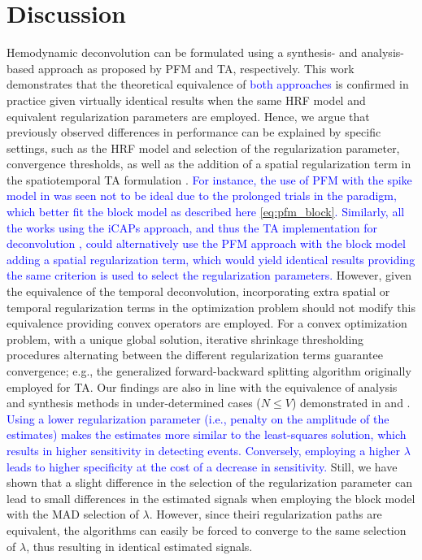 
\section{Discussion}

Hemodynamic deconvolution can be formulated using a synthesis- and
analysis-based approach as proposed by PFM and TA, respectively. This work
demonstrates that the theoretical equivalence of \textcolor{blue}{both
approaches} is confirmed in practice given virtually identical results when the
same HRF model and equivalent regularization parameters are employed. Hence, we
argue that previously observed differences in performance can be explained by
specific settings, such as the HRF model and selection of the regularization
parameter, convergence thresholds, as well as the addition of a spatial
regularization term in the spatiotemporal TA formulation
\citep{Karahanoglu2013TotalactivationfMRI}. \textcolor{blue}{For instance, the
use of PFM with the spike model in \citep{Tan_2017} was seen not to be ideal due
to the prolonged trials in the paradigm, which better fit the block model as
described here \eqref{eq:pfm_block}. Similarly, all the works using the iCAPs
approach, and thus the TA implementation for deconvolution
\citep{Kinany2020DynamicFunctionalConnectivity,Zoeller2019Largescalebrain,
Pirondini2022Poststrokereorganization},
could alternatively use the PFM approach with the block model adding a
spatial regularization term, which would yield identical results providing the
same criterion is used to select the regularization parameters.} However, given
the equivalence of the temporal deconvolution, incorporating extra spatial or
temporal regularization terms in the optimization problem should not modify this
equivalence providing convex operators are employed. For a convex optimization
problem, with a unique global solution, iterative shrinkage thresholding
procedures alternating between the different regularization terms guarantee
convergence; e.g., the generalized forward-backward splitting
\citep{Raguet2013GeneralizedForwardBackward} algorithm originally employed for
TA. Our findings are also in line with the equivalence of analysis and synthesis
methods in under-determined cases (\(N \leq V\)) demonstrated in
\citep{Elad2007Analysisversussynthesis} and \citep{ortelli2019synthesis}.
\textcolor{blue}{Using a lower regularization parameter (i.e., penalty on the
amplitude of the estimates) makes the estimates more similar to the
least-squares solution, which results in higher sensitivity in detecting events.
Conversely, employing a higher $\lambda$ leads to higher specificity at the cost
of a decrease in sensitivity.} Still, we have shown that a slight difference in
the selection of the regularization parameter can lead to small differences in
the estimated signals when employing the block model with the MAD selection of
$\lambda$. However, since theiri regularization paths are equivalent, the
algorithms can easily be forced to converge to the same selection of $\lambda$,
thus resulting in identical estimated signals.

